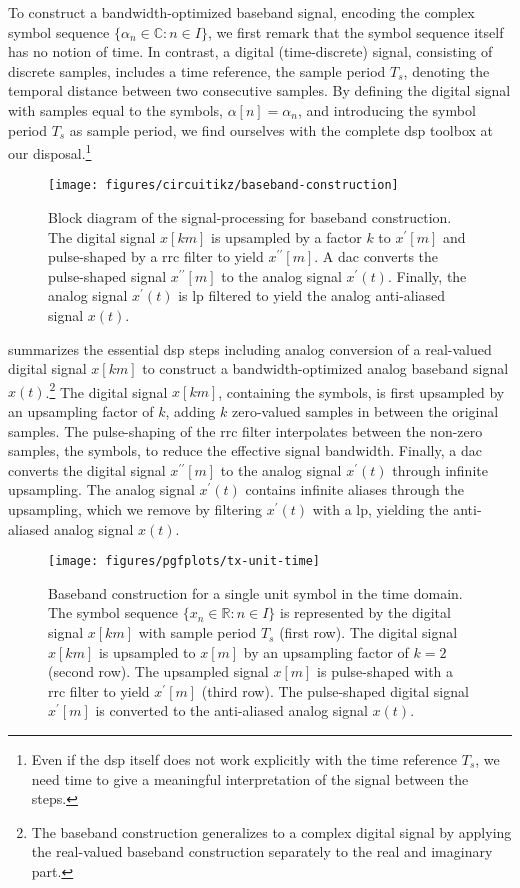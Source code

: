 To construct a bandwidth-optimized baseband signal, encoding the complex symbol sequence $\{\alpha_n\in\mathbb{C}\colon n\in I\}$, we first remark that the symbol sequence itself has no notion of time.
In contrast, a digital (time-discrete) signal, consisting of discrete samples, includes a time reference, the sample period $T_s$, denoting the temporal distance between two consecutive samples.
By defining the digital signal with samples equal to the symbols, $\alpha[n]=\alpha_n$, and introducing the symbol period $T_s$ as sample period, we find ourselves with the complete \gls{dsp} toolbox at our disposal.\footnote{Even if the \gls{dsp} itself does not work explicitly with the time reference $T_s$, we need time to give a meaningful interpretation of the signal between the steps.}
\begin{figure}[htb]
	\centering
	\texttt{[image: figures/circuitikz/baseband-construction]}
	\caption{Block diagram of the signal-processing for baseband construction. The digital signal $x[km]$ is upsampled by a factor $k$ to $x^\prime[m]$ and pulse-shaped by a \gls{rrc} filter to yield $x^{\prime\prime}[m]$. A \gls{dac} converts the pulse-shaped signal $x^{\prime\prime}[m]$ to the analog signal $x^\prime(t)$. Finally, the analog signal $x^\prime(t)$ is \gls{lp} filtered to yield the analog anti-aliased signal $x(t)$.}\label{fig:baseband_construction}
\end{figure}
 summarizes the essential \gls{dsp} steps including analog conversion of a real-valued digital signal $x[km]$ to construct a bandwidth-optimized analog baseband signal $x(t)$.\footnote{The baseband construction generalizes to a complex digital signal by applying the real-valued baseband construction separately to the real and imaginary part.}
The digital signal $x[km]$, containing the symbols, is first upsampled by an upsampling factor of $k$, adding $k$ zero-valued samples in between the original samples.
The pulse-shaping of the \gls{rrc} filter interpolates between the non-zero samples, the symbols, to reduce the effective signal bandwidth.
Finally, a \gls{dac} converts the digital signal $x^{\prime\prime}[m]$ to the analog signal $x^\prime(t)$ through infinite upsampling.
The analog signal $x^\prime(t)$ contains infinite aliases through the upsampling, which we remove by filtering $x^\prime(t)$ with a \gls{lp}, yielding the anti-aliased analog signal $x(t)$.
\begin{figure}[htb]
	\centering
	\texttt{[image: figures/pgfplots/tx-unit-time]}
	\caption{Baseband construction for a single unit symbol in the time domain. The symbol sequence $\{x_n\in\mathbb{R}\colon n\in I\}$ is represented by the digital signal $x[km]$ with sample period $T_s$ (first row). The digital signal $x[km]$ is upsampled to $x[m]$ by an upsampling factor of $k=2$ (second row). The upsampled signal $x[m]$ is pulse-shaped with a \gls{rrc} filter to yield $x^\prime[m]$ (third row). The pulse-shaped digital signal $x^\prime[m]$ is converted to the anti-aliased analog signal $x(t)$.}\label{fig:baseband_construction_unit_time}
\end{figure}
